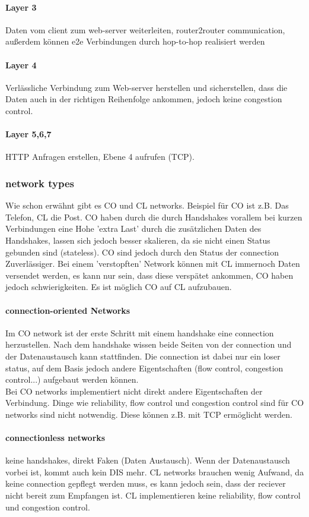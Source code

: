             \paragraph{Layer 3}
                Daten vom client zum web-server weiterleiten, router2router communication, außerdem können e2e Verbindungen durch hop-to-hop realisiert werden
            \paragraph{Layer 4}
                Verlässliche Verbindung zum Web-server herstellen und sicherstellen, dass die Daten auch in der richtigen Reihenfolge ankommen, jedoch keine congestion control. 
            
            \paragraph{Layer 5,6,7}
                HTTP Anfragen erstellen, Ebene 4 aufrufen (TCP). 
            
        \subsubsection{network types}
            Wie schon erwähnt gibt es CO und CL networks. Beispiel für CO ist z.B. Das Telefon, CL die Post. CO haben durch die durch Handshakes vorallem bei kurzen Verbindungen eine Hohe 'extra Last' durch die zusätzlichen Daten des Handshakes, lassen sich jedoch besser skalieren, da sie nicht einen Status gebunden sind (stateless). CO sind jedoch durch den Status der connection Zuverlässiger. Bei einem 'verstopften' Network können mit CL immernoch Daten versendet werden, es kann nur sein, dass diese verspätet ankommen, CO haben jedoch schwierigkeiten. Es ist möglich CO auf CL aufzubauen.
            \paragraph{connection-oriented Networks}
                Im CO network ist der erste Schritt mit einem handshake eine connection herzustellen. Nach dem handshake wissen beide Seiten von der connection und der Datenaustausch kann stattfinden. Die connection ist dabei nur ein loser status, auf dem Basis jedoch andere Eigentschaften (flow control, congestion control...) aufgebaut werden können. \\ 
                Bei CO networks implementiert nicht direkt andere Eigentschaften der Verbindung. Dinge wie reliability, flow control und congestion control sind für CO networks sind nicht notwendig. Diese können z.B. mit TCP ermöglicht werden.
            \paragraph{connectionless networks}
                keine handshakes, direkt Faken (Daten Austausch). Wenn der Datenaustausch vorbei ist, kommt auch kein DIS mehr. CL networks brauchen wenig Aufwand, da keine connection gepflegt werden muss, es kann jedoch sein, dass der reciever nicht bereit zum Empfangen ist. CL implementieren keine reliability, flow control und congestion control. 
            
            